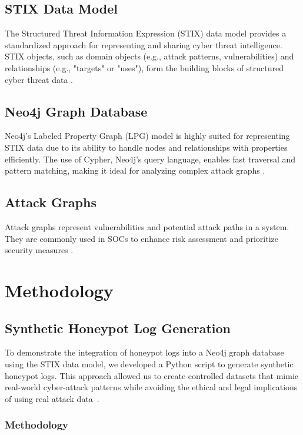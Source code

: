 \documentclass[conference]{IEEEtran}
\begin{document}
\subsection{STIX Data Model}
The Structured Threat Information Expression (STIX) data model provides a standardized approach for representing and sharing cyber threat intelligence. STIX objects, such as domain objects (e.g., attack patterns, vulnerabilities) and relationships (e.g., "targets" or "uses"), form the building blocks of structured cyber threat data \cite{simonnagy2022attackgraphs}.


\subsection{Neo4j Graph Database}
Neo4j's Labeled Property Graph (LPG) model is highly suited for representing STIX data due to its ability to handle nodes and relationships with properties efficiently. The use of Cypher, Neo4j’s query language, enables fast traversal and pattern matching, making it ideal for analyzing complex attack graphs \cite{simonnagy2022attackgraphs}.


\subsection{Attack Graphs}
Attack graphs represent vulnerabilities and potential attack paths in a system. They are commonly used in SOCs to enhance risk assessment and prioritize security measures \cite{attackgraphsurvey}.

\section{Methodology}
\subsection{Synthetic Honeypot Log Generation}

To demonstrate the integration of honeypot logs into a Neo4j graph database using the STIX data model, we developed a Python script to generate synthetic honeypot logs. This approach allowed us to create controlled datasets that mimic real-world cyber-attack patterns while avoiding the ethical and legal implications of using real attack data~\cite{provos2007virtual}.

\subsubsection{Methodology}
\end{document}

